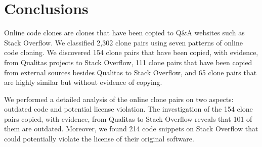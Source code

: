 \documentclass[10pt,journal,compsoc]{IEEEtran}
\begin{document}
%

\section{Conclusions}

Online code clones are clones that have been copied to Q\&A websites
such as Stack Overflow. 
We classified 2,302 clone pairs using seven patterns of online code
cloning. We discovered 154 clone pairs that have been
copied, with evidence, from Qualitas projects to Stack Overflow, 111
clone pairs that have been copied from external sources besides
Qualitas to Stack Overflow, and 65 clone pairs that are highly
similar but without evidence of copying.

We performed a detailed analysis of the online clone pairs on two
aspects: outdated code and potential license violation. The investigation of
the 154 clone pairs copied, with evidence, from Qualitas to Stack
Overflow reveals that 101 of them are outdated.  Moreover, we found 214
code snippets on Stack Overflow that could potentially violate the license of their
original software.
\end{document}
